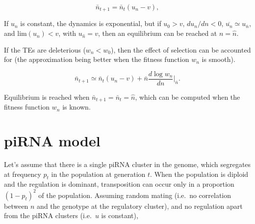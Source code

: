 \documentclass[10pt,a4paper]{article}
\begin{document}
\begin{equation}
\bar n_{t+1} = \bar n_t(u_n - v),
\end{equation}


If $u_n$ is constant, the dynamics is exponential, but if $u_0 > v$, $d u_n / d n < 0$, $\overline{u_n} \simeq u_{\bar n}$, and $\mathrm{lim} (u_n) < v$, with $u_{\hat n} = v$, then an equilibrium can be reached at $n = \hat n$. 

If the TEs are deleterious ($w_n < w_0$), then the effect of selection can be accounted for (the approximation being better when the fitness function $w_n$ is smooth). 

\begin{equation}\label{eq:cc2}
\bar n_{t+1} \simeq \bar n_t(u_n - v) + \bar n \frac{d \log w_n}{d n} \Bigr|_{\bar n}.
\end{equation}

Equilibrium is reached when $\bar n_{t+1} = \bar n_t = \hat n$, which can be computed when the fitness function $w_n$ is known. 



\section{piRNA model}

Let's assume that there is a single piRNA cluster in the genome, which segregates at frequency $p_t$ in the population at generation $t$. When the population is diploid and the regulation is dominant, transposition can occur only in a proportion $(1-p_t)^2$ of the population. Assuming random mating (i.e.\ no correlation between $n$ and the genotype at the regulatory cluster), and no regulation apart from the piRNA clusters (i.e.\ $u$ is constant),
\end{document}
